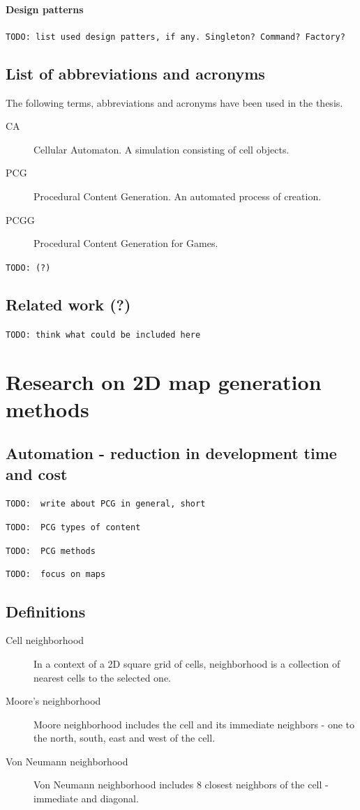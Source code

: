 \documentclass[12pt]{report}
\newcommand{\todo}[1]{}
\renewcommand{\todo}[1]{{\color{red} \par \noindent \footnotesize \texttt{TODO: {#1} }}}
\begin{document}
\subsubsection{Design patterns} 
\todo{list used design patters, if any. Singleton? Command? Factory?}
 
\section{List of abbreviations and acronyms} 

The following terms, abbreviations and acronyms have been used in the thesis.

\begin{description}
	\item[CA] Cellular Automaton. A simulation consisting of cell objects.
	\item[PCG] Procedural Content Generation. An automated process of creation.
	\item[PCGG]	Procedural Content Generation for Games.  
\end{description}
\todo{(?)}

\section{Related work (?)} 

\todo{think what could be included here}

\chapter{Research on 2D map generation methods} \label{rozdzial.teoria}



\section{ Automation - reduction in development time and cost}



\todo{ write about PCG in general, short }
\todo{ PCG types of content }
\todo{ PCG methods }
\todo{ focus on maps }

\section{Definitions} 

\begin{description}
	\item[Cell neighborhood] In a context of a 2D square grid of cells, neighborhood is a collection of nearest cells to the selected one.
	\item[Moore's neighborhood]  Moore neighborhood includes the cell and its immediate neighbors - one to the north, south, east and west of the cell.
	\item[Von Neumann neighborhood] Von Neumann neighborhood includes 8 closest neighbors of the cell - immediate and diagonal.
\end{description}
\end{document}

